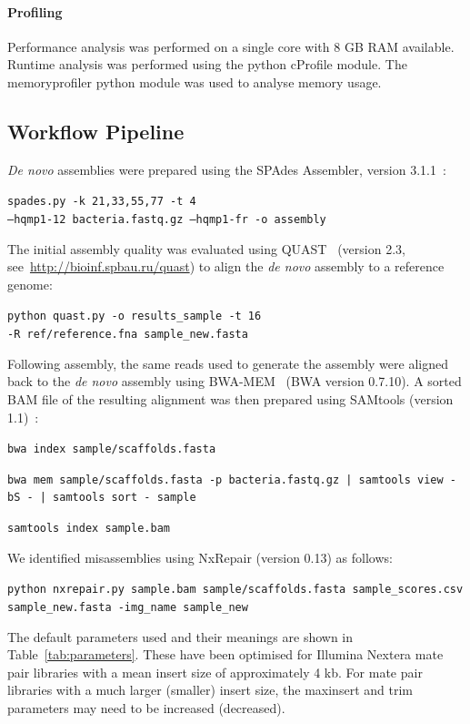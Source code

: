 \paragraph{Profiling}
Performance analysis was performed on a single core with 8 GB RAM available. Runtime analysis was performed using the python cProfile module. The memoryprofiler python module was used to analyse memory usage.

\subsection{Workflow Pipeline}
\textit{De novo} assemblies were prepared using the SPAdes Assembler, version 3.1.1~\cite{Bankevich2012}:

\texttt{spades.py -k 21,33,55,77 -t 4 \\ --hqmp1-12 bacteria.fastq.gz  --hqmp1-fr -o assembly}

The initial assembly quality was evaluated using QUAST~\cite{Gurevich2013} (version 2.3, see~\url{http://bioinf.spbau.ru/quast}) to align the \textit{de novo} assembly to a reference genome:

\texttt{python quast.py -o results\_sample -t 16 \\  -R ref/reference.fna sample\_new.fasta }

  Following assembly, the same reads used to generate the assembly were aligned back to the \textit{de novo} assembly using BWA-MEM~\cite{li2013} (BWA version 0.7.10). A sorted BAM file of the resulting alignment was then prepared using SAMtools (version 1.1)~\cite{li2009}: 

\texttt{bwa index sample/scaffolds.fasta}

\texttt{bwa mem sample/scaffolds.fasta -p bacteria.fastq.gz | samtools view -bS - |  samtools sort - sample}

\texttt{samtools index sample.bam}

We identified misassemblies using NxRepair (version 0.13) as follows:

\texttt{python nxrepair.py sample.bam   sample/scaffolds.fasta sample\_scores.csv  sample\_new.fasta -img\_name sample\_new}


The default parameters used and their meanings are shown in Table~\ref{tab:parameters}. These have been optimised for Illumina Nextera mate pair libraries with a mean insert size of approximately 4 kb. For mate pair libraries with a much larger (smaller) insert size, the maxinsert and trim parameters may need to be increased (decreased).

